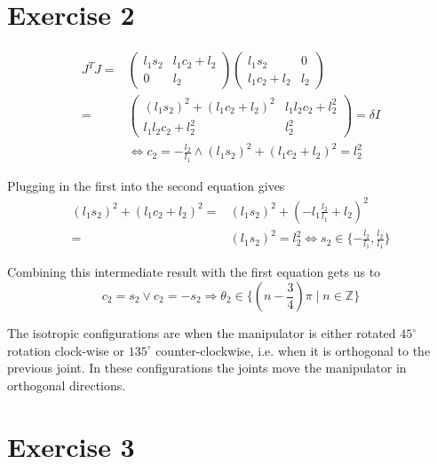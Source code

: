 \documentclass[10pt,a4paper]{article}
\begin{document}
\section*{Exercise 2}

\begin{align*}
  J^{T}J = & \begin{pmatrix}
    l_{1}s_{2} & l_{1}c_{2} + l_{2}\\
    0 & l_{2}
  \end{pmatrix} \begin{pmatrix}
    l_{1}s_{2} & 0\\
    l_{1}c_{2} + l_{2} & l_{2}
  \end{pmatrix}\\
  = & \begin{pmatrix}
    \left( l_{1}s_{2} \right)^{2} + \left( l_{1}c_{2} + l_{2} \right)^{2} & l_{1}l_{2}c_{2} + l_{2}^{2}\\
    l_{1}l_{2}c_{2} + l_{2}^{2} & l_{2}^{2}
  \end{pmatrix} = \delta I\\
  & \Leftrightarrow c_{2} = -\frac{l_{2}}{l_{1}} \land \left( l_{1}s_{2} \right)^{2} + \left( l_{1}c_{2} + l_{2} \right)^{2} = l_{2}^{2}
\end{align*}

Plugging in the first into the second equation gives
\begin{align*}
  \left( l_{1}s_{2} \right)^{2} + \left( l_{1}c_{2} + l_{2} \right)^{2} = & \left( l_{1}s_{2} \right)^{2} + \left( -l_{1}\frac{l_{2}}{l_{1}} + l_{2} \right)^{2}\\
  = & \left( l_{1}s_{2} \right)^{2} = l_{2}^{2} \Leftrightarrow s_{2} \in \{ -\frac{l_{2}}{l_{1}}, \frac{l_{2}}{l_{1}} \}
\end{align*}

Combining this intermediate result with the first equation gets us to
\begin{equation*}
  c_{2} = s_{2} \lor c_{2} = -s_{2} \Rightarrow \theta_{2} \in \{ \left( n - \frac{3}{4} \right)\pi \mid n \in \mathbb{Z} \}
\end{equation*}

The isotropic configurations are when the manipulator is either rotated $45^{\circ}$ rotation clock-wise or $135^{\circ}$ counter-clockwise, i.e. when it is orthogonal to the previous joint.
In these configurations the joints move the manipulator in orthogonal directions.

\section*{Exercise 3}
\end{document}
